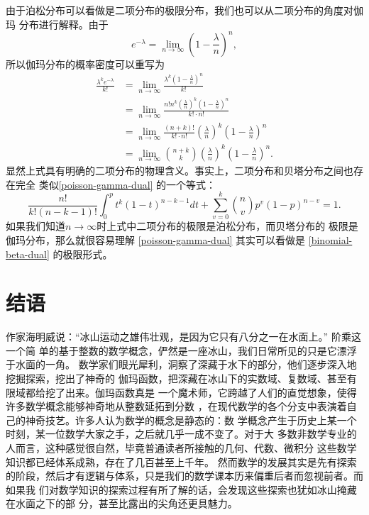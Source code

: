 {由于泊松分布可以看做是二项分布的极限分布，我们也可以从二项分布的角度对伽玛
分布进行解释。由于 
$$ e^{-\lambda} = \lim_{n\rightarrow \infty} (1- \frac{\lambda}{n}) ^n ,$$
所以伽玛分布的概率密度可以重写为
\begin{align*}
\frac{\lambda^k e^{-\lambda}}{k!} 
& = \lim_{n\rightarrow \infty} \frac{\lambda^k (1-\frac{\lambda}{n}) ^n}{k!}  \\
& = \lim_{n\rightarrow \infty} \frac{ n! n^k (\frac{\lambda}{n})^k (1-\frac{\lambda}{n}) ^n}{k! \cdot n!} \\
& = \lim_{n\rightarrow \infty} \frac{(n+k)!}{k!\cdot n!} (\frac{\lambda}{n})^k (1-\frac{\lambda}{n}) ^n  \\
& = \lim_{n\rightarrow \infty} \binom{n+k}{k} (\frac{\lambda}{n})^k (1-\frac{\lambda}{n}) ^n  .
\end{align*}
显然上式具有明确的二项分布的物理含义。事实上，二项分布和贝塔分布之间也存在完全
类似\eqref{poisson-gamma-dual} 的一个等式：
\begin{equation}
\label{binomial-beta-dual}
\frac{n!}{k!(n-k-1)!} \int_0^p t^k(1-t)^{n-k-1} dt + \sum_{v=0}^k \binom{n}{v} p^v(1-p)^{n-v} = 1 .
\end{equation}
如果我们知道$n\rightarrow\infty$时上式中二项分布的极限是泊松分布，而贝塔分布的
极限是伽玛分布，那么就很容易理解 \eqref{poisson-gamma-dual} 其实可以看做是
\eqref{binomial-beta-dual} 的极限形式。 

\section{结语}

作家海明威说：“冰山运动之雄伟壮观，是因为它只有八分之一在水面上。”
阶乘这一个简
单的基于整数的数学概念，俨然是一座冰山，我们日常所见的只是它漂浮于水面的一角。
数学家们眼光犀利，洞察了深藏于水下的部分，他们逐步深入地挖掘探索，挖出了神奇的
伽玛函数，把深藏在冰山下的实数域、复数域、甚至有限域都给挖了出来。伽玛函数真是
一个魔术师，它跨越了人们的直觉想象，使得许多数学概念能够神奇地从整数延拓到分数
，在现代数学的各个分支中表演着自己的神奇技艺。许多人认为数学的概念是静态的：数
学概念产生于历史上某一个时刻，某一位数学大家之手，之后就几乎一成不变了。对于大
多数非数学专业的人而言，这种感觉很自然，毕竟普通读者所接触的几何、代数、微积分
这些数学知识都已经体系成熟，存在了几百甚至上千年。 然而数学的发展其实是先有探索
的阶段，然后才有逻辑与体系，只是我们的数学课本历来偏重后者而忽视前者。而如果我
们对数学知识的探索过程有所了解的话，会发现这些探索也犹如冰山掩藏在水面之下的部
分，甚至比露出的尖角还更具魅力。 

}
